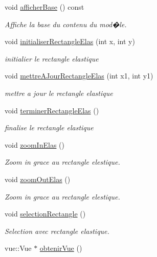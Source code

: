 \begin{DoxyCompactItemize}
void \hyperlink{group__inf2990_ga8fd84489fa3f0936e6fd5a2e6d9d9439}{afficher\+Base} () const
\begin{DoxyCompactList}\small\item\em Affiche la base du contenu du mod�le. \end{DoxyCompactList}\item 
void \hyperlink{group__inf2990_ga12ab3532311b25c8f95bf116ff50c340}{initialiser\+Rectangle\+Elas} (int x, int y)
\begin{DoxyCompactList}\small\item\em initialier le rectangle elastique \end{DoxyCompactList}\item 
void \hyperlink{group__inf2990_gad62020361b7b54738ce1f043b593a899}{mettre\+A\+Jour\+Rectangle\+Elas} (int x1, int y1)
\begin{DoxyCompactList}\small\item\em mettre a jour le rectangle elastique \end{DoxyCompactList}\item 
void \hyperlink{group__inf2990_gadcc8863ea29b0f4cea87325cc910455f}{terminer\+Rectangle\+Elas} ()
\begin{DoxyCompactList}\small\item\em finalise le rectangle elastique \end{DoxyCompactList}\item 
void \hyperlink{group__inf2990_gad76f00b2335eadd3807334196490c162}{zoom\+In\+Elas} ()
\begin{DoxyCompactList}\small\item\em Zoom in grace au rectangle elestique. \end{DoxyCompactList}\item 
void \hyperlink{group__inf2990_ga0364cd87c45bb8555e5489529c9397e3}{zoom\+Out\+Elas} ()
\begin{DoxyCompactList}\small\item\em Zoom in grace au rectangle elestique. \end{DoxyCompactList}\item 
void \hyperlink{group__inf2990_gad72a7884085823a04fde536274aa3f12}{selection\+Rectangle} ()
\begin{DoxyCompactList}\small\item\em Selection avec rectangle elastique. \end{DoxyCompactList}\item 
vue\+::\+Vue $\ast$ \hyperlink{group__inf2990_gaa56cf96b7e381e0f14e2c9a55be913bf}{obtenir\+Vue} ()

\end{DoxyCompactItemize}
